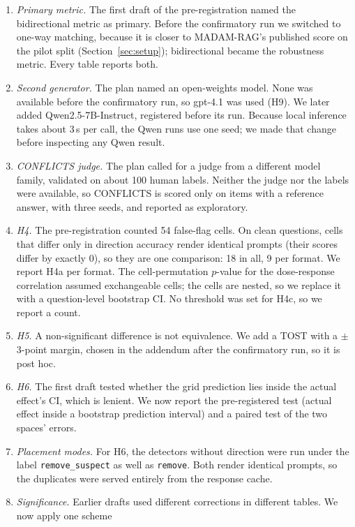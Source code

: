 \begin{enumerate}[leftmargin=*,itemsep=1pt,topsep=2pt]
\item \emph{Primary metric.} The first draft of the pre-registration named the bidirectional metric as primary. Before
the confirmatory run we switched to one-way matching, because it is closer to MADAM-RAG's published score on the pilot
split (Section~\ref{sec:setup}); bidirectional became the robustness metric. Every table reports both.
\item \emph{Second generator.} The plan named an open-weights model. None was available before the confirmatory run, so
gpt-4.1 was used (H9). We later added Qwen2.5-7B-Instruct, registered before its run. Because local inference
takes about 3\,s per call, the Qwen runs use one seed; we made that change before inspecting any Qwen result.
\item \emph{CONFLICTS judge.} The plan called for a judge from a different model family, validated on about 100 human
labels. Neither the judge nor the labels were available, so CONFLICTS is scored only on items with a reference answer,
with three seeds, and reported as exploratory.
\item \emph{H4.} The pre-registration counted 54 false-flag cells. On clean questions, cells that differ only in
direction accuracy render identical prompts (their scores differ by exactly 0), so they are one comparison: 18 in
all, 9 per format. We report H4a per format. The cell-permutation $p$-value for the dose-response correlation assumed
exchangeable cells; the cells are nested, so we replace it with a question-level bootstrap CI. No threshold was set
for H4c, so we report a count.
\item \emph{H5.} A non-significant difference is not equivalence. We add a TOST with a $\pm$3-point margin, chosen in
the addendum after the confirmatory run, so it is post hoc.
\item \emph{H6.} The first draft tested whether the grid prediction lies inside the actual effect's CI, which is
lenient. We now report the pre-registered test (actual effect inside a bootstrap prediction interval) and a paired test
of the two spaces' errors.
\item \emph{Placement modes.} For H6, the detectors without direction were run under the label
\texttt{remove\_suspect} as well as \texttt{remove}. Both render identical prompts, so the duplicates were served entirely from
the response cache.
\item \emph{Significance.} Earlier drafts used different corrections in different tables. We now apply one scheme

\end{enumerate}
